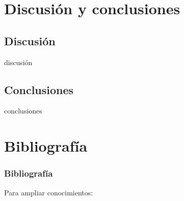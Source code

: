 \documentclass[12pt]{beamer}
\begin{document}
\section{Discusión y conclusiones}
\subsection{Discusión}
\begin{frame}
	discusión
\end{frame}

\subsection{Conclusiones}
\begin{frame}
	conclusiones
\end{frame}

\section{Bibliografía}
\begin{frame}[allowframebreaks]
	\frametitle{Bibliografía}
	
	Para ampliar conocimientos: \nocite{chuvieco2002teledeteccion,schowengerdt2006}
	
	
\end{frame}
\end{document}
